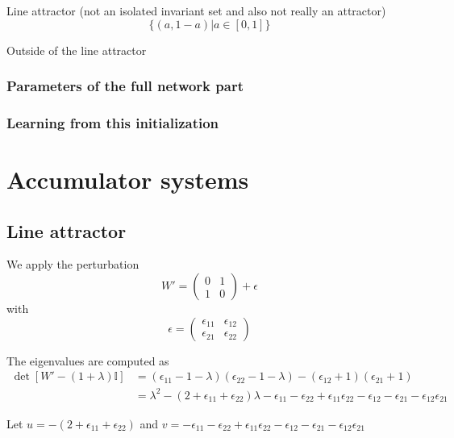 \documentclass{article}
\theoremstyle{definition}
\theoremstyle{remark}
\begin{document}
Line attractor (not an isolated invariant set and also not really an attractor)
\[ \{(a,1-a) | a\in[0,1]\}\]

Outside of the line attractor


\subsubsection{Parameters of the full network part}



\subsubsection{Learning from this initialization}







\newpage

\section{Accumulator systems}
\subsection{Line attractor}
We apply the perturbation
\begin{equation}
W' = 
\begin{pmatrix}
0  &  1 \\
1  &  0
\end{pmatrix}
+ \epsilon
\end{equation}
with 
\begin{equation}
\epsilon = 
\begin{pmatrix}
\epsilon_{11}  &  \epsilon_{12} \\
\epsilon_{21}  &  \epsilon_{22}
\end{pmatrix}
\end{equation}


The eigenvalues are computed as
\begin{align*}
\det [W' -(1+\lambda)\mathbb{I}] &= (\epsilon_{11}-1-\lambda)(\epsilon_{22}-1-\lambda)-(\epsilon_{12}+1)(\epsilon_{21}+1)\\
&=\lambda^2 - (2+\epsilon_{11}+\epsilon_{22})\lambda -\epsilon_{11}-\epsilon_{22}+\epsilon_{11}\epsilon_{22} -\epsilon_{12} - \epsilon_{21} - \epsilon_{12}\epsilon_{21}
\end{align*}

Let 
$u=- (2+\epsilon_{11}+\epsilon_{22})$
and 
$v=-\epsilon_{11}-\epsilon_{22}+\epsilon_{11}\epsilon_{22} -\epsilon_{12} - \epsilon_{21} - \epsilon_{12}\epsilon_{21}$
\end{document}
